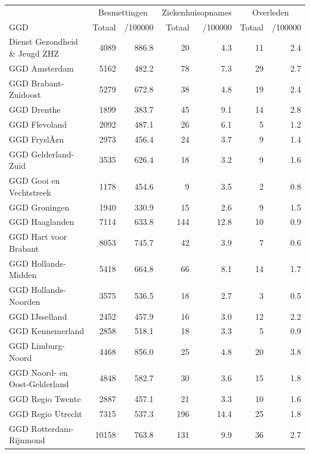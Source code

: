 \documentclass[
  english,
  man,floatsintext]{apa6}
\begin{document}
\begin{table}
\centering\begingroup\fontsize{10}{12}\selectfont

\begin{threeparttable}
\begin{tabular}{lrrrrrr}
\toprule
\multicolumn{1}{c}{ } & \multicolumn{2}{c}{Besmettingen} & \multicolumn{2}{c}{Ziekenhuisopnames} & \multicolumn{2}{c}{Overleden} \\
\cmidrule(l{3pt}r{3pt}){2-3} \cmidrule(l{3pt}r{3pt}){4-5} \cmidrule(l{3pt}r{3pt}){6-7}
GGD & Totaal & /100000 & Totaal & /100000 & Totaal & /100000\\
\midrule
Dienst Gezondheid \& Jeugd ZHZ & 4089 & 886.8 & 20 & 4.3 & 11 & 2.4\\
GGD Amsterdam & 5162 & 482.2 & 78 & 7.3 & 29 & 2.7\\
GGD Brabant-Zuidoost & 5279 & 672.8 & 38 & 4.8 & 19 & 2.4\\
GGD Drenthe & 1899 & 383.7 & 45 & 9.1 & 14 & 2.8\\
GGD Flevoland & 2092 & 487.1 & 26 & 6.1 & 5 & 1.2\\
GGD FryslÃ¢n & 2973 & 456.4 & 24 & 3.7 & 9 & 1.4\\
GGD Gelderland-Zuid & 3535 & 626.4 & 18 & 3.2 & 9 & 1.6\\
GGD Gooi en Vechtstreek & 1178 & 454.6 & 9 & 3.5 & 2 & 0.8\\
GGD Groningen & 1940 & 330.9 & 15 & 2.6 & 9 & 1.5\\
GGD Haaglanden & 7114 & 633.8 & 144 & 12.8 & 10 & 0.9\\
GGD Hart voor Brabant & 8053 & 745.7 & 42 & 3.9 & 7 & 0.6\\
GGD Hollands-Midden & 5418 & 664.8 & 66 & 8.1 & 14 & 1.7\\
GGD Hollands-Noorden & 3575 & 536.5 & 18 & 2.7 & 3 & 0.5\\
GGD IJsselland & 2452 & 457.9 & 16 & 3.0 & 12 & 2.2\\
GGD Kennemerland & 2858 & 518.1 & 18 & 3.3 & 5 & 0.9\\
GGD Limburg-Noord & 4468 & 856.0 & 25 & 4.8 & 20 & 3.8\\
GGD Noord- en Oost-Gelderland & 4848 & 582.7 & 30 & 3.6 & 15 & 1.8\\
GGD Regio Twente & 2887 & 457.1 & 21 & 3.3 & 10 & 1.6\\
GGD Regio Utrecht & 7315 & 537.3 & 196 & 14.4 & 25 & 1.8\\
GGD Rotterdam-Rijnmond & 10158 & 763.8 & 131 & 9.9 & 36 & 2.7\\

\end{tabular}
\end{threeparttable}
\end{table}
\end{document}

